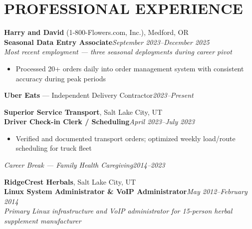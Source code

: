 \documentclass[9pt,letterpaper]{extarticle}
\begin{document}
\section*{PROFESSIONAL EXPERIENCE}

\noindent\textbf{Harry and David} (1-800-Flowers.com, Inc.), Medford, OR\\
\textbf{Seasonal Data Entry Associate}\hfill\textit{September 2023--December 2025}\\
\textit{Most recent employment --- three seasonal deployments during career pivot}
\begin{itemize}
  \item Processed 20+ orders daily into order management system with consistent accuracy during peak periods
\end{itemize}

\vspace{3pt}
\noindent\textbf{Uber Eats} --- Independent Delivery Contractor\hfill\textit{2023--Present}

\vspace{5pt}
\noindent\textbf{Superior Service Transport}, Salt Lake City, UT\\
\textbf{Driver Check-in Clerk / Scheduling}\hfill\textit{April 2023--July 2023}
\begin{itemize}
  \item Verified and documented transport orders; optimized weekly load/route scheduling for truck fleet
\end{itemize}

\vspace{3pt}
\noindent\textit{Career Break --- Family Health Caregiving}\hfill\textit{2014--2023}

\vspace{5pt}
\noindent\textbf{RidgeCrest Herbals}, Salt Lake City, UT\\
\textbf{Linux System Administrator \& VoIP Administrator}\hfill\textit{May 2012--February 2014}\\
\textit{Primary Linux infrastructure and VoIP administrator for 15-person herbal supplement manufacturer}
\end{document}

